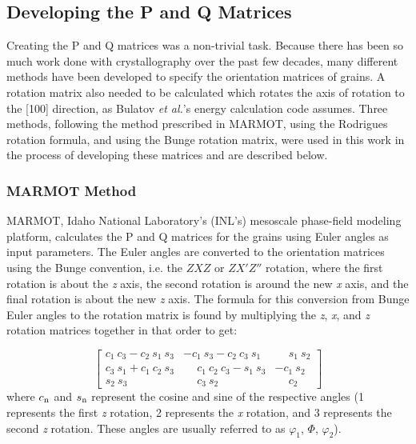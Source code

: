 \documentclass[twoside,senior]{BYUPhys}
\begin{document}
\subsection{Developing the P and Q Matrices\label{chi2:PQ}}
Creating the P and Q matrices was a non-trivial task.  Because there has been so much work done with crystallography over the past few decades, many different methods have been developed to specify the orientation matrices of grains. A rotation matrix also needed to be calculated which rotates the axis of rotation to the [100] direction, as Bulatov \emph{et al.}'s energy calculation code assumes.  Three methods, following the method prescribed in MARMOT, using the Rodrigues rotation formula, and using the Bunge rotation matrix, were used in this work in the process of developing these matrices and are described below.

\subsubsection{MARMOT Method\label{PQ:MARMOT}}
MARMOT, Idaho National Laboratory's (INL's) mesoscale phase-field modeling platform,\cite{tonks2012} calculates the P and Q matrices for the grains using Euler angles as input parameters.  The Euler angles are converted to the orientation matrices using the Bunge convention, i.e. the $ZXZ$ or $ZX'Z''$ rotation, where the first rotation is about the \emph{z} axis, the second rotation is around the new \emph{x} axis, and the final rotation is about the new \emph{z} axis.  The formula for this conversion from Bunge Euler angles to the rotation matrix is found by multiplying the \emph{z}, \emph{x}, and \emph{z} rotation matrices together in that order to get:

\begin{equation}
\label{eq:bungeMat}
\left[
\begin{array}{ccc}
c_1\ c_3 - c_2\ s_1\ s_3 & -c_1\ s_3 - c_2\ c_3\ s_1 & \phantom{-}s_1\ s_2 \\
c_3\ s_1 + c_1\ c_2\ s_3 & \phantom{-}c_1\ c_2\ c_3 - s_1\ s_3 & -c_1\ s_2 \\
s_2\ s_3 & \phantom{-}c_3\ s_2 & \phantom{-}c_2 
\end{array}
\right]
\end{equation}
where $c_\textnormal{n}$ and $s_\textnormal{n}$ represent the cosine and sine of the respective angles (1 represents the first \emph{z} rotation, 2 represents the \emph{x} rotation, and 3 represents the second \emph{z} rotation.  These angles are usually referred to as\cite{randle2000} $\varphi_1$, $\Phi$, $\varphi_2$).
\end{document}
